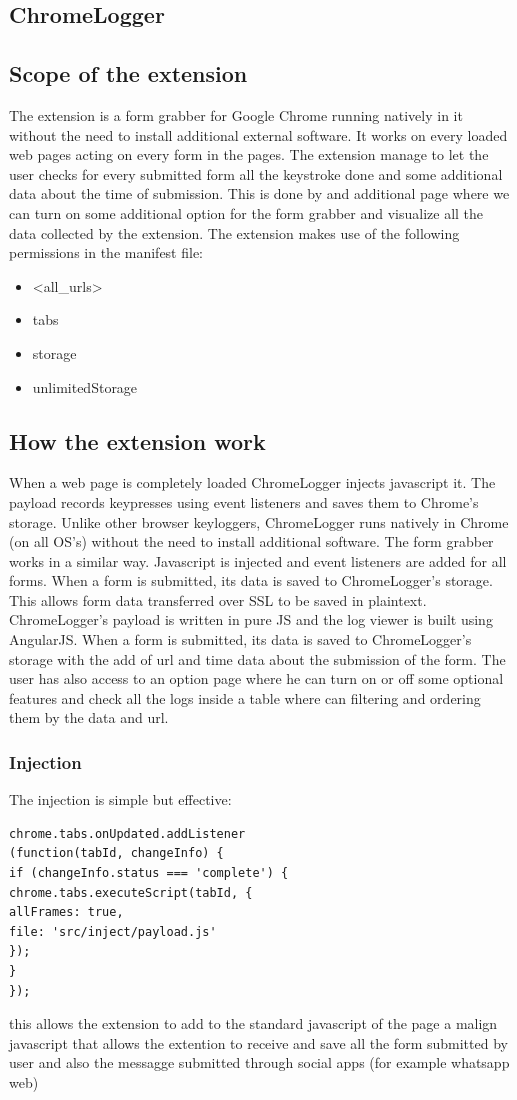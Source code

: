 \documentclass[12pt]{article}
\begin{document}
\begin{multicols}{2}
\section*{ChromeLogger}
\subsection*{Scope of the extension}
The extension is a form grabber for Google Chrome running natively in it without the need to install additional external software. It works on every loaded web pages acting on every form in the pages.
The extension manage to let the user checks for every submitted form all the keystroke done and some additional data about the time of submission. This is done by and additional page where we can turn on some additional option for the form grabber and visualize all the data collected by the extension.
The extension makes use of the following permissions in the manifest file:
{\fontsize{10}{10}\selectfont
	\begin{itemize}
		\item  <all\_urls>
		\item  tabs
		\item  storage
		\item  unlimitedStorage
	\end{itemize}
}
\subsection*{How the extension work}
When a web page is completely loaded ChromeLogger injects javascript it. The payload records keypresses using event listeners and saves them to Chrome's storage. Unlike other browser keyloggers, ChromeLogger runs natively in Chrome (on all OS's) without the need to install additional software.
The form grabber works in a similar way. Javascript is injected and event listeners are added for all forms. When a form is submitted, its data is saved to ChromeLogger's storage. This allows form data transferred over SSL to be saved in plaintext.
ChromeLogger's payload is written in pure JS and the log viewer is built using AngularJS. When a form is submitted, its data is saved to ChromeLogger's storage with the add of url and time data about the submission of the form.
The user has also access to an option page where he can turn on or off some optional features and check all the logs inside a table where can filtering and ordering them by the data and url.
\subsubsection*{Injection}
The injection is simple but effective:
\begin{lstlisting}
chrome.tabs.onUpdated.addListener
(function(tabId, changeInfo) {
if (changeInfo.status === 'complete') {
chrome.tabs.executeScript(tabId, {
allFrames: true, 
file: 'src/inject/payload.js'
});
}
});
\end{lstlisting}
this allows the extension to add to the standard javascript of the page a malign javascript that allows the extention to receive and save all the form submitted by user and also the messagge submitted through social apps (for example whatsapp web)

\end{multicols}
\end{document}
